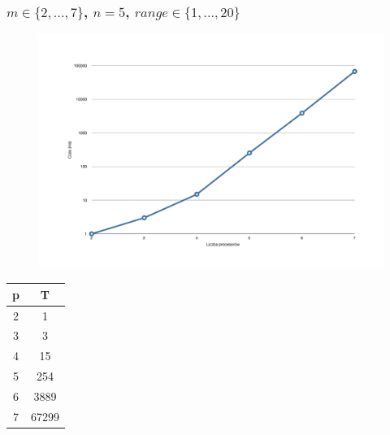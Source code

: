 \documentclass[wide,a4paper,titlepage,12pt] {article}
\begin{document}
    \subsubsection{$m \in \{2,...,7\}$, $n=5$, $range \in \{1,...,20\}$}
     \begin{figure}[htbp]
      \begin{center}
       \includegraphics[width=\textwidth]{Fig1.pdf}
        \caption{}
        \label{fig1}
      \end{center}
    \end{figure}
    \begin{center}
    \begin{tabular}{ |c|c| } \hline
      p & T \\ \hline
      2 & 1 \\ 
      3 & 3 \\
      4 & 15 \\
      5 & 254 \\
      6 & 3889 \\
      7 & 67299 \\ \hline
    \end{tabular}
    \end{center}
        \newpage
\end{document}
